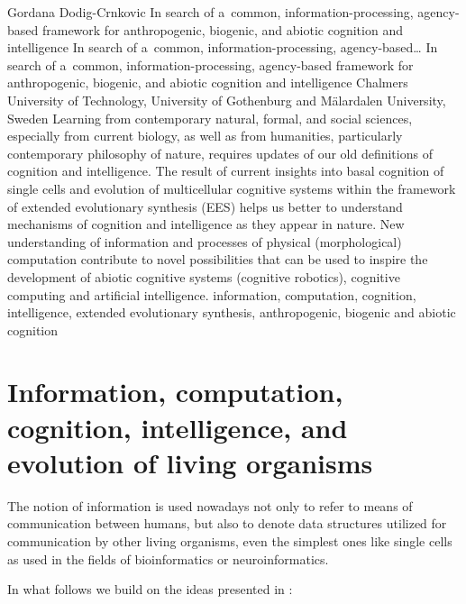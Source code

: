 \begin{artengenv}{Gordana Dodig-Crnkovic}
	{In search of a~common, information-processing, agency-based framework for anthropogenic, biogenic, and abiotic cognition and intelligence}
	{In search of a~common, information-processing, agency-based\ldots}
	{In search of a~common, information-processing, agency-based framework for anthropogenic, biogenic, and abiotic cognition and intelligence}
	{Chalmers University of Technology, University of Gothenburg and Mälardalen University, Sweden}
	{Learning from contemporary natural, formal, and social sciences, especially from current biology, as well as from humanities, particularly contemporary philosophy of nature, requires updates of our old definitions of cognition and intelligence. The result of current insights into basal cognition of single cells and evolution of multicellular cognitive systems within the framework of extended evolutionary synthesis (EES) helps us better to understand mechanisms of cognition and intelligence as they appear in nature. New understanding of information and processes of physical (morphological) computation contribute to novel possibilities that can be used to inspire the development of abiotic cognitive systems (cognitive robotics), cognitive computing and artificial intelligence.
	}
	{information, computation, cognition, intelligence, extended evolutionary synthesis, anthropogenic, biogenic and abiotic cognition}


\section*{Information, computation, cognition, intelligence, and evolution of living organisms}
The notion of information is used nowadays not only to refer to means of communication between humans, but also to denote data structures utilized for communication by other living organisms, even the simplest ones like single cells as used in the fields of bioinformatics or neuroinformatics.

In what follows we build on the ideas presented in
\parencite[][]{dodig-crnkovic_computational_2017}:%


\end{artengenv}
